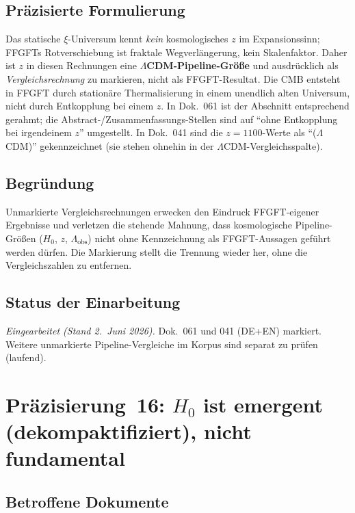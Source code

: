 \subsection*{Präzisierte Formulierung}

Das statische $\xi$-Universum kennt \emph{kein} kosmologisches $z$ im
Expansionssinn; FFGFTs Rotverschiebung ist fraktale Wegverlängerung, kein
Skalenfaktor. Daher ist $z$ in diesen Rechnungen eine
\textbf{$\Lambda$CDM-Pipeline-Größe} und ausdrücklich als
\emph{Vergleichsrechnung} zu markieren, nicht als FFGFT-Resultat. Die CMB
entsteht in FFGFT durch stationäre Thermalisierung in einem unendlich alten
Universum, nicht durch Entkopplung bei einem $z$. In Dok.~061 ist der
Abschnitt entsprechend gerahmt; die Abstract-/Zusammenfassungs-Stellen sind
auf \enquote{ohne Entkopplung bei irgendeinem $z$} umgestellt. In Dok.~041
sind die $z=1100$-Werte als \enquote{($\Lambda$CDM)} gekennzeichnet (sie
stehen ohnehin in der $\Lambda$CDM-Vergleichsspalte).

\subsection*{Begründung}

Unmarkierte Vergleichsrechnungen erwecken den Eindruck FFGFT-eigener
Ergebnisse und verletzen die stehende Mahnung, dass kosmologische
Pipeline-Größen ($H_0$, $z$, $\Lambda_{\text{obs}}$) nicht ohne Kennzeichnung
als FFGFT-Aussagen geführt werden dürfen. Die Markierung stellt die Trennung
wieder her, ohne die Vergleichszahlen zu entfernen.

\subsection*{Status der Einarbeitung}

\emph{Eingearbeitet (Stand 2.~Juni 2026).} Dok.~061 und 041 (DE+EN) markiert.
Weitere unmarkierte Pipeline-Vergleiche im Korpus sind separat zu prüfen
(laufend).

\section{\texorpdfstring{Präzisierung~16: $H_0$ ist emergent (dekompaktifiziert), nicht fundamental}{Praezisierung 16: H0 ist emergent, nicht fundamental}}

\subsection*{Betroffene Dokumente}


